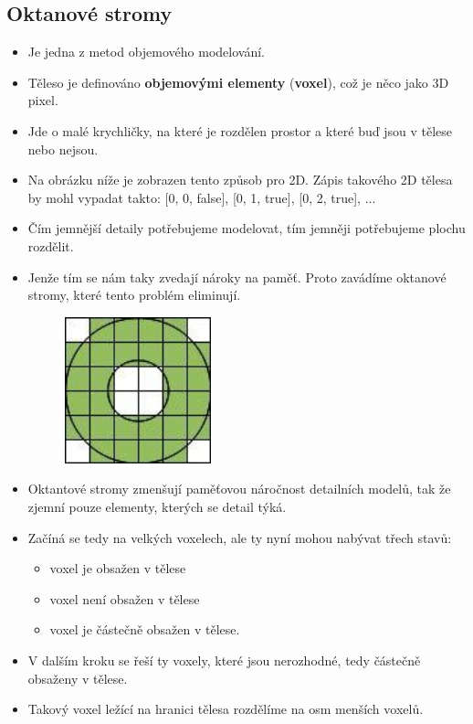  \subsection{Oktanové stromy}
 \begin{itemize}
 	\item Je jedna z metod objemového modelování.
 	\item Těleso je definováno \textbf{objemovými elementy} (\textbf{voxel}), což je něco jako 3D pixel.
 	\item Jde o malé krychličky, na které je rozdělen prostor a které buď jsou v tělese nebo nejsou.
 	\item Na obrázku níže je zobrazen tento způsob pro 2D. Zápis takového 2D tělesa by mohl vypadat takto: [0, 0, false], [0, 1, true], [0, 2, true], ...
	\item Čím jemnější detaily potřebujeme modelovat, tím jemněji potřebujeme plochu rozdělit.
	\item Jenže tím se nám taky zvedají nároky na paměť. Proto zavádíme oktanové stromy, které tento problém eliminují.
		\begin{figure}[H]
		\centering
		\includegraphics[width=0.4\textwidth]{assets/4_octan}
		\end{figure}
	\item Oktantové stromy zmenšují paměťovou náročnost detailních modelů, tak že zjemní pouze elementy, kterých se detail týká.
	\item Začíná se tedy na velkých voxelech, ale ty nyní mohou nabývat třech stavů:	
	 \begin{itemize}
			\item voxel je obsažen v tělese
			\item voxel není obsažen v tělese
			\item voxel je částečně obsažen v tělese.
	\end{itemize}
	\item V dalším kroku se řeší ty voxely, které jsou nerozhodné, tedy částečně obsaženy v tělese.
	\item Takový voxel ležící na hranici tělesa rozdělíme na osm menších voxelů.

\end{itemize}
